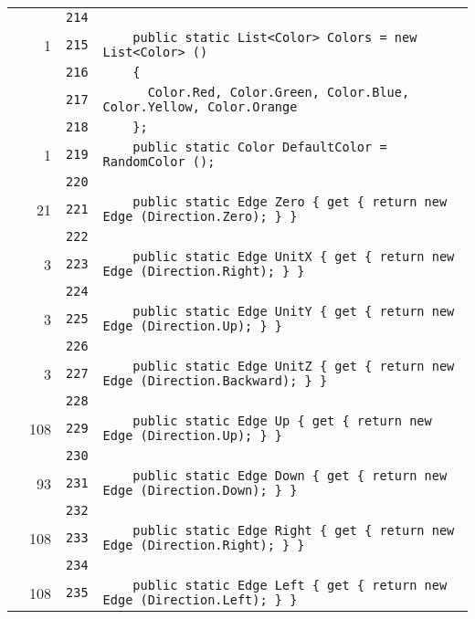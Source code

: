 \documentclass[a4paper,10pt]{article}
\begin{document}
\begin{longtable}[l]{lrrl}
\cellcolor{gray} &  & \verb~214~ & \verb~~\\
\cellcolor{green} & 1 & \verb~215~ & \verb~    public static List<Color> Colors = new List<Color> ()~\\
\cellcolor{gray} &  & \verb~216~ & \verb~    {~\\
\cellcolor{gray} &  & \verb~217~ & \verb~      Color.Red, Color.Green, Color.Blue, Color.Yellow, Color.Orange~\\
\cellcolor{gray} &  & \verb~218~ & \verb~    };~\\
\cellcolor{green} & 1 & \verb~219~ & \verb~    public static Color DefaultColor = RandomColor ();~\\
\cellcolor{gray} &  & \verb~220~ & \verb~~\\
\cellcolor{green} & 21 & \verb~221~ & \verb~    public static Edge Zero { get { return new Edge (Direction.Zero); } }~\\
\cellcolor{gray} &  & \verb~222~ & \verb~~\\
\cellcolor{green} & 3 & \verb~223~ & \verb~    public static Edge UnitX { get { return new Edge (Direction.Right); } }~\\
\cellcolor{gray} &  & \verb~224~ & \verb~~\\
\cellcolor{green} & 3 & \verb~225~ & \verb~    public static Edge UnitY { get { return new Edge (Direction.Up); } }~\\
\cellcolor{gray} &  & \verb~226~ & \verb~~\\
\cellcolor{green} & 3 & \verb~227~ & \verb~    public static Edge UnitZ { get { return new Edge (Direction.Backward); } }~\\
\cellcolor{gray} &  & \verb~228~ & \verb~~\\
\cellcolor{green} & 108 & \verb~229~ & \verb~    public static Edge Up { get { return new Edge (Direction.Up); } }~\\
\cellcolor{gray} &  & \verb~230~ & \verb~~\\
\cellcolor{green} & 93 & \verb~231~ & \verb~    public static Edge Down { get { return new Edge (Direction.Down); } }~\\
\cellcolor{gray} &  & \verb~232~ & \verb~~\\
\cellcolor{green} & 108 & \verb~233~ & \verb~    public static Edge Right { get { return new Edge (Direction.Right); } }~\\
\cellcolor{gray} &  & \verb~234~ & \verb~~\\
\cellcolor{green} & 108 & \verb~235~ & \verb~    public static Edge Left { get { return new Edge (Direction.Left); } }~\\

\end{longtable}
\end{document}

